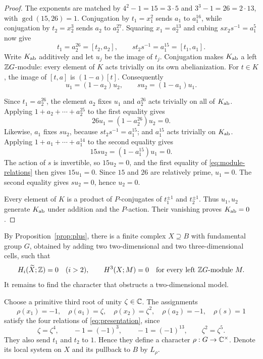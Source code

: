 \begin{proof}
The exponents are matched by $4^2-1=15=3\cdot5$ and
$3^3-1=26=2\cdot13$, with $\gcd(15,26)=1$.
Conjugation by $t_1=x_1^2$ sends $a_1$ to $a_1^{16}$, while
conjugation by $t_2=x_2^3$ sends $a_2$ to $a_2^{27}$.
Squaring $x_1=a_2^{13}$ and cubing $s x_2s^{-1}=a_1^5$ now give
\begin{equation}\label{eq:commutators}
 t_1=a_2^{26}=[t_2,a_2],
 \qquad
 s t_2 s^{-1}=a_1^{15}=[t_1,a_1].
\end{equation}
Write $K_{\mathrm{ab}}$ additively and let $u_j$ be the image of $t_j$.
Conjugation makes $K_{\mathrm{ab}}$ a left $\mathbb Z G$-module: every element
of $K$ acts trivially on its own abelianization. For $t\in K$,
the image of $[t,a]$ is $(1-a)[t]$. Consequently
\begin{equation}\label{eq:module-relations}
 u_1=(1-a_2)u_2,
 \qquad s u_2=(1-a_1)u_1.
\end{equation}

Since $t_1=a_2^{26}$, the element $a_2$ fixes $u_1$ and
$a_2^{26}$ acts trivially on all of $K_{\mathrm{ab}}$. Applying
$1+a_2+\cdots+a_2^{25}$ to the first equality gives
\[
 26u_1=(1-a_2^{26})u_2=0.
\]
Likewise, $a_1$ fixes $s u_2$, because $s t_2s^{-1}=a_1^{15}$;
and $a_1^{15}$ acts trivially on $K_{\mathrm{ab}}$. Applying
$1+a_1+\cdots+a_1^{14}$ to the second equality gives
\[
 15s u_2=(1-a_1^{15})u_1=0.
\]
The action of $s$ is invertible, so $15u_2=0$, and the first
equality of \eqref{eq:module-relations} then gives $15u_1=0$.
Since $15$ and $26$ are relatively prime, $u_1=0$. The second
equality gives $s u_2=0$, hence $u_2=0$.

Every element of $K$ is a product of $P$-conjugates of $t_1^{\pm1}$
and $t_2^{\pm1}$. Thus $u_1,u_2$ generate $K_{\mathrm{ab}}$ under
addition and the $P$-action. Their vanishing proves $K_{\mathrm{ab}}=0$.
\end{proof}

By Proposition~\ref{prop:plus}, there is a finite complex $X\supseteq B$
with fundamental group $G$, obtained by adding two two-dimensional
and two three-dimensional cells, such that
\begin{equation}\label{eq:d2-for-x}
 H_i(\widetilde X;\mathbb Z)=0\quad(i>2),\qquad
 H^3(X;M)=0\quad\text{for every left }\mathbb Z G\text{-module }M.
\end{equation}
It remains to find the character that obstructs a two-dimensional model.

Choose a primitive third root of unity $\zeta\in\mathbb C$. The assignments
\begin{equation}\label{eq:character}
 \rho(x_1)=-1,\quad \rho(a_1)=\zeta,\quad
 \rho(x_2)=\zeta^2,\quad \rho(a_2)=-1,\quad \rho(s)=1
\end{equation}
satisfy the four relations of \eqref{eq:presentation}, since
\[
 \zeta=\zeta^4,\qquad -1=(-1)^3,\qquad
 -1=(-1)^{13},\qquad \zeta^2=\zeta^5.
\]
They also send $t_1$ and $t_2$ to $1$. Hence they define a character
$\rho:G\to\mathbb C^\times$. Denote its local system on $X$ and its
pullback to $B$ by $L_\rho$.

